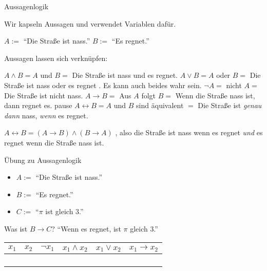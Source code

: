 \documentclass[]{beamer}
\begin{document}
\begin{frame}{Aussagenlogik}
	
	Wir kapseln Aussagen und verwendet Variablen dafür. 
	
	\begin{itemize}
		\pitem $A := $ ``Die Straße ist nass.''
		\pitem $B := $ ``Es regnet.''
	\end{itemize}

	\pause Aussagen lassen sich verknüpfen:
	
	\begin{itemize}
		\pitem {} $A \land B = A$ und $B = $ Die Straße ist nass und es regnet.
		\pitem {}  $A \lor B  = A$ oder $B  = $ Die Straße ist nass oder es regnet . Es kann auch beides wahr sein.
		\pitem {}  $\lnot A  = $ nicht $A  = $ Die Straße ist nicht nass.
		\pitem {}  $A \rightarrow B  = $ Aus $A$ folgt $B  = $ Wenn die Straße nass ist, dann regnet es.
		\pitem {}pause $A \leftrightarrow B  = A$ und $B$ sind äquivalent $ = $ Die Straße ist \emph{genau dann} nass, \emph{wenn} es regnet.
		\begin{itemize}
			\pitem $A \leftrightarrow B = (A \rightarrow B) \land (B \rightarrow A)$  , also die Straße ist nass wenn es regnet \emph{und} es regnet wenn die Straße nass ist.
		\end{itemize}
	\end{itemize}

\end{frame}

\begin{frame}{Übung zu Aussagenlogik}
	
	\begin{itemize}
		\item $A := $ ``Die Straße ist nass.''
		\item $B := $ ``Es regnet.''
		\item $C := $ ``$\pi$ ist gleich $3$.''
	\end{itemize}

	\begin{itemize}
		\pitem Was ist $B \rightarrow C$?   ``Wenn es regnet, ist $\pi$ gleich $3$.''
	\end{itemize}

	\pause
	
	\begin{center}
		\begin{tabular}{c|c||c|c|c|c}%
			\hline
			$x_1$ & $x_2$ & $\lnot x_1$ & $x_1 \land x_2$ & $x_1 \lor x_2$ & $x_1 \rightarrow x_2$ \\
			\hline
			\F & \F & \W & \F & \F & \W \\
			\F & \W & \W & \F & \W & \W \\
			\W & \F & \F & \F & \W & \F \\
			\W & \W & \F & \W & \W & \W \\
			\hline
		\end{tabular}
	\end{center}
	
\end{frame}
\end{document}
